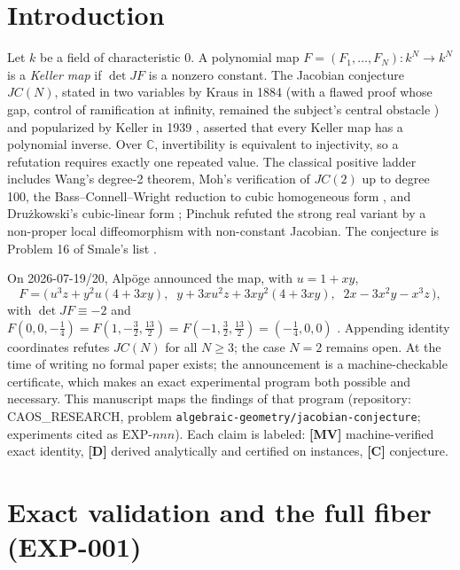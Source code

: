 \documentclass[11pt]{article}
\theoremstyle{definition}
\theoremstyle{remark}
\newcommand{\C}{\mathbb{C}}
\newcommand{\detJ}{\det JF}
\begin{document}
\section{Introduction}

Let $k$ be a field of characteristic $0$. A polynomial map $F = (F_1, \dots, F_N) : k^N \to k^N$
is a \emph{Keller map} if $\detJ$ is a nonzero constant. The Jacobian conjecture $JC(N)$,
stated in two variables by Kraus in 1884 (with a flawed proof whose gap, control of ramification
at infinity, remained the subject's central obstacle \cite{Rodriguez2026}) and popularized by
Keller in 1939 \cite{Keller1939}, asserted that every Keller map has a polynomial inverse. Over
$\C$, invertibility is equivalent to injectivity, so a refutation requires exactly one repeated
value. The classical positive ladder includes Wang's degree-2 theorem, Moh's verification of
$JC(2)$ up to degree 100, the Bass--Connell--Wright reduction to cubic homogeneous form
\cite{BCW1982}, and Dru\.zkowski's cubic-linear form \cite{Druzkowski1983}; Pinchuk
\cite{Pinchuk1994} refuted the strong real variant by a non-proper local diffeomorphism with
non-constant Jacobian. The conjecture is Problem 16 of Smale's list \cite{Smale1998}.

On 2026-07-19/20, Alp\"oge announced the map, with $u = 1 + xy$,
\begin{equation}\label{eq:F}
F = \bigl(\,u^3 z + y^2 u (4 + 3xy),\;\; y + 3x u^2 z + 3x y^2 (4 + 3xy),\;\; 2x - 3x^2 y - x^3 z\,\bigr),
\end{equation}
with $\detJ \equiv -2$ and
$F(0, 0, -\tfrac14) = F(1, -\tfrac32, \tfrac{13}{2}) = F(-1, \tfrac32, \tfrac{13}{2}) =
(-\tfrac14, 0, 0)$ \cite{Alpoge2026}. Appending identity coordinates refutes $JC(N)$ for all
$N \ge 3$; the case $N = 2$ remains open. At the time of writing no formal paper exists; the
announcement is a machine-checkable certificate, which makes an exact experimental program both
possible and necessary. This manuscript maps the findings of that program (repository:
CAOS\_RESEARCH, problem \texttt{algebraic-geometry/jacobian-conjecture}; experiments cited as
EXP-$nnn$). Each claim is labeled: \textbf{[MV]} machine-verified exact identity,
\textbf{[D]} derived analytically and certified on instances, \textbf{[C]} conjecture.

\section{Exact validation and the full fiber (EXP-001)}
\end{document}
